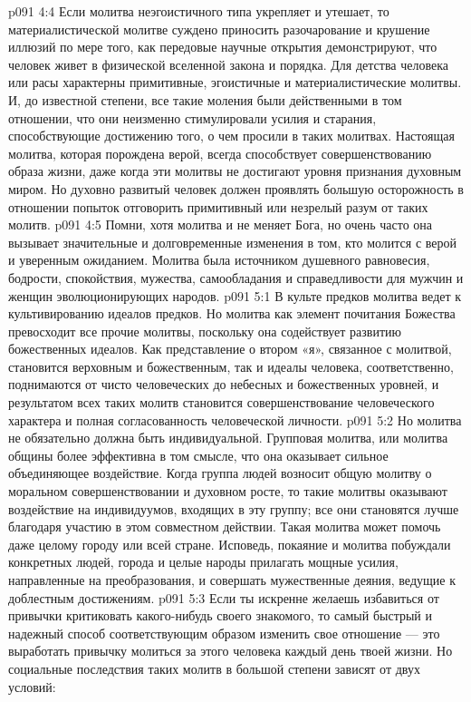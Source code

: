 \vs p091 4:4 Если молитва неэгоистичного типа укрепляет и утешает, то материалистической молитве суждено приносить разочарование и крушение иллюзий по мере того, как передовые научные открытия демонстрируют, что человек живет в физической вселенной закона и порядка. Для детства человека или расы характерны примитивные, эгоистичные и материалистические молитвы. И, до известной степени, все такие моления были действенными в том отношении, что они неизменно стимулировали усилия и старания, способствующие достижению того, о чем просили в таких молитвах. Настоящая молитва, которая порождена верой, всегда способствует совершенствованию образа жизни, даже когда эти молитвы не достигают уровня признания духовным миром. Но духовно развитый человек должен проявлять большую осторожность в отношении попыток отговорить примитивный или незрелый разум от таких молитв.
\vs p091 4:5 \pc Помни, хотя молитва и не меняет Бога, но очень часто она вызывает значительные и долговременные изменения в том, кто молится с верой и уверенным ожиданием. Молитва была источником душевного равновесия, бодрости, спокойствия, мужества, самообладания и справедливости для мужчин и женщин эволюционирующих народов.
\vs p091 5:1 В культе предков молитва ведет к культивированию идеалов предков. Но молитва как элемент почитания Божества превосходит все прочие молитвы, поскольку она содействует развитию божественных идеалов. Как представление о втором «я», связанное с молитвой, становится верховным и божественным, так и идеалы человека, соответственно, поднимаются от чисто человеческих до небесных и божественных уровней, и результатом всех таких молитв становится совершенствование человеческого характера и полная согласованность человеческой личности.
\vs p091 5:2 Но молитва не обязательно должна быть индивидуальной. Групповая молитва, или молитва общины более эффективна в том смысле, что она оказывает сильное объединяющее воздействие. Когда группа людей возносит общую молитву о моральном совершенствовании и духовном росте, то такие молитвы оказывают воздействие на индивидуумов, входящих в эту группу; все они становятся лучше благодаря участию в этом совместном действии. Такая молитва может помочь даже целому городу или всей стране. Исповедь, покаяние и молитва побуждали конкретных людей, города и целые народы прилагать мощные усилия, направленные на преобразования, и совершать мужественные деяния, ведущие к доблестным достижениям.
\vs p091 5:3 \pc Если ты искренне желаешь избавиться от привычки критиковать какого\hyp{}нибудь своего знакомого, то самый быстрый и надежный способ соответствующим образом изменить свое отношение --- это выработать привычку молиться за этого человека каждый день твоей жизни. Но социальные последствия таких молитв в большой степени зависят от двух условий:
